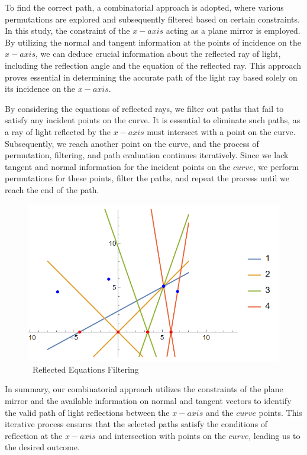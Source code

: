 \documentclass[12pt,a4paper,twoside]{report}
\begin{document}
To find the correct path, a combinatorial approach is adopted, where various permutations are explored and subsequently filtered based on certain constraints. In this study, the constraint of the $x-axis$ acting as a plane mirror is employed. By utilizing the normal and tangent information at the points of incidence on the $x-axis$, we can deduce crucial information about the reflected ray of light, including the reflection angle and the equation of the reflected ray. This approach proves essential in determining the accurate path of the light ray based solely on its incidence on the $x-axis$.

By considering the equations of reflected rays, we filter out paths that fail to satisfy any incident points on the curve. It is essential to eliminate such paths, as a ray of light reflected by the $x-axis$ must intersect with a point on the curve. Subsequently, we reach another point on the curve, and the process of permutation, filtering, and path evaluation continues iteratively. Since we lack tangent and normal information for the incident points on the $curve$, we perform permutations for these points, filter the paths, and repeat the process until we reach the end of the path.



\begin{figure}[h]
	\centering
	\includegraphics[height = 0.5\textwidth]{combth.png}
	
	\caption{~Reflected Equations Filtering}
\end{figure}

In summary, our combinatorial approach utilizes the constraints of the plane mirror and the available information on normal and tangent vectors to identify the valid path of light reflections between the $x-axis$ and the $curve$ points. This iterative process ensures that the selected paths satisfy the conditions of reflection at the $x-axis$ and intersection with points on the $curve$, leading us to the desired outcome.
\end{document}
